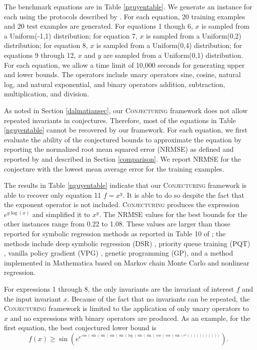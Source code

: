 \documentclass[ijds,nonblindrev]{informs-ijds}
\begin{document}
The benchmark equations are in Table \ref{nguyentable}.  We generate an instance for each using the protocols described by \cite{petersen}.  For each equation, 20 training examples and 20 test examples are generated.  For equations 1 though 6, $x$ is sampled from a Uniform(-1,1) distribution; for equation 7, $x$ is sampled from a Uniform(0,2) distribution; for equation 8, $x$ is sampled from a Uniform(0,4) distribution; for equations 9 through 12, $x$ and $y$ are sampled from a Uniform(0,1) distribution.  For each equation, we allow a time limit of 10,000 seconds for generating upper and lower bounds.  The operators include unary operators sine, cosine, natural log, and natural exponential, and binary operators addition, subtraction, multiplication, and division. 

As noted in Section \ref{dalmatiansec}, our \textsc{Conjecturing} framework does not allow repeated invariants in conjectures.  Therefore, most of the equations in Table \ref{nguyentable} cannot be recovered by our framework.  For each equation, we first evaluate the ability of the conjectured bounds to approximate the equation by reporting the normalized root mean squared error (NRMSE) as defined and reported by \citet{petersen} and described in Section \ref{comparison}.  We report NRMSE for the conjecture with the lowest mean average error for the training examples.  

The results in Table \ref{nguyentable} indicate that our \textsc{Conjecturing} framework is able to recover only equation 11 $f=x^y$.  It is able to do so despite the fact that the exponent operator is not included.  \textsc{Conjecturing} produces the expression $e^{y\log(x)}$ and simplified it to $x^y$.  The NRMSE values for the best bounds for the other instances range from 0.22 to 1.08.  These values are larger than those reported for symbolic regression methods as reported in Table 10 of \cite{petersen}; the methods include deep symbolic regression (DSR) \cite{petersen}, priority queue training (PQT) \cite{abolafia}, vanilla policy gradient (VPG) \cite{petersen}, genetic programming (GP), and a method implemented in Mathematica based on Markov chain Monte Carlo and nonlinear regression.

For expressions 1 through 8, the only invariants are the invariant of interest $f$ and the input invariant $x$.  Because of the fact that no invariants can be repeated, the \textsc{Conjecturing} framework is limited to the application of only unary operators to $x$ and no expressions with binary operators are produced.  As an example, for the first equation, the best conjectured lower bound is
\[
f(x) \geq \sin(e^{e^{\cos(\sin(\sin(\sin(\sin(\log(\sin(\sin(\cos(\cos(\sin(e^x)))))))))))}}).
\]
\end{document}
